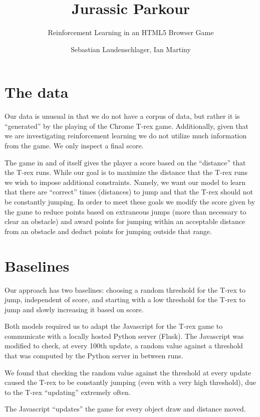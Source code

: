 \documentclass{scrartcl}
\title{Jurassic Parkour}
\subtitle{Reinforcement Learning in an HTML5 Browser Game}
\author{Sebastian Laudenschlager, Ian Martiny}
\begin{document}
\maketitle

\section{The data}

Our data is unusual in that we do not have a corpus of data, but rather it is
``generated'' by the playing of the Chrome T-rex game. Additionally, given that
we are investigating reinforcement learning we do not utilize much information
from the game. We only inspect a final score.

The game in and of itself gives the player a score based on the ``distance''
that the T-rex runs. While our goal is to maximize the distance that the T-rex
runs we wish to impose additional constraints. Namely, we want our model to
learn that there are ``correct'' times (distances) to jump and that the T-rex 
should not be constantly jumping. In order to meet these goals we modify the
score given by the game to reduce points based on extraneous jumps (more than
necessary to clear an obstacle) and award points for jumping within an
acceptable distance from an obstacle and deduct points for jumping outside that
range.

\section{Baselines}

Our approach has two baselines: choosing a random threshold for the T-rex to
jump, independent of score, and starting with a low threshold for the T-rex to
jump and slowly increasing it based on score.

Both models required us to adapt the Javascript for the T-rex game to
communicate with a locally hosted Python server (Flask). The Javascript was
modified to check, at every 100th update, a random value against a threshold
that was computed by the Python server in between runs.

We found that checking the random value against the threshold at every update
caused the T-rex to be constantly jumping (even with a very high threshold), due
to the T-rex ``updating'' extremely often. 

The Javascript ``updates'' the game for every object draw and distance moved.
\end{document}
